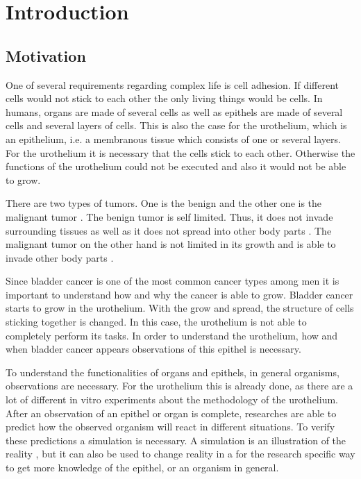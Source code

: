 \chapter{Introduction}
\section{Motivation}
One of several requirements regarding complex life is cell adhesion. If different cells would not stick to each other the only living things would be cells. 
In humans, organs are made of several cells as well as epithels are made of several cells and several layers of cells. This is also the case for the urothelium, which is an epithelium, i.e. a membranous tissue which consists of one or several layers. For the urothelium it is necessary that the cells stick to each other. Otherwise the functions of the urothelium could not be executed and also it would not be able to grow.%

There are two types of tumors. One is the benign and the other one is the malignant tumor \cite{Poplawski2009}. The benign tumor is self limited. Thus, it does not invade surrounding tissues as well as it does not spread into other body parts \cite{Poplawski2009}. The malignant tumor on the other hand is not limited in its growth and is able to invade other body parts \cite{Poplawski2009}. 

Since bladder cancer is one of the most common cancer types among men it is important to understand how and why the cancer is able to grow. \newline
Bladder cancer starts to grow in the urothelium. With the grow and spread, the structure of cells sticking together is changed. In this case, the urothelium is not able to completely perform its tasks. In order to understand the urothelium, how and when bladder cancer appears observations of this epithel is necessary. 

To understand the functionalities of organs and epithels, in general organisms, observations are necessary. For the urothelium this is already done, as there are a lot of different in vitro experiments about the methodology of the urothelium. After an observation of an epithel or organ is complete, researches are able to predict how the observed organism will react in different situations. To verify these predictions a simulation is necessary. A simulation is an illustration of the reality \cite{REF}, but it can also be used to change reality in a for the research specific way to get more knowledge of the epithel, or an organism in general.

